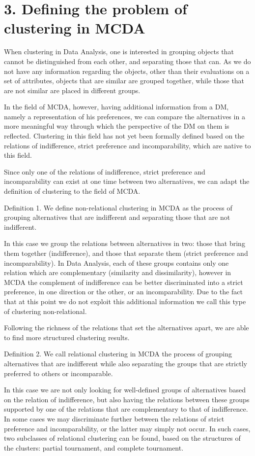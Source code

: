 \documentclass[10pt]{article}
\begin{document}
\section*{3. Defining the problem of clustering in MCDA}
When clustering in Data Analysis, one is interested in grouping objects that cannot be distinguished from each other, and separating those that can. As we do not have any information regarding the objects, other than their evaluations on a set of attributes, objects that are similar are grouped together, while those that are not similar are placed in different groups.

In the field of MCDA, however, having additional information from a DM, namely a representation of his preferences, we can compare the alternatives in a more meaningful way through which the perspective of the DM on them is reflected. Clustering in this field has not yet been formally defined based on the relations of indifference, strict preference and incomparability, which are native to this field.

Since only one of the relations of indifference, strict preference and incomparability can exist at one time between two alternatives, we can adapt the definition of clustering to the field of MCDA.

Definition 1. We define non-relational clustering in MCDA as the process of grouping alternatives that are indifferent and separating those that are not indifferent.

In this case we group the relations between alternatives in two: those that bring them together (indifference), and those that separate them (strict preference and incomparability). In Data Analysis, each of these groups contains only one relation which are complementary (similarity and dissimilarity), however in MCDA the complement of indifference can be better discriminated into a strict preference, in one direction or the other, or an incomparability. Due to the fact that at this point we do not exploit this additional information we call this type of clustering non-relational.

Following the richness of the relations that set the alternatives apart, we are able to find more structured clustering results.

Definition 2. We call relational clustering in MCDA the process of grouping alternatives that are indifferent while also separating the groups that are strictly preferred to others or incomparable.

In this case we are not only looking for well-defined groups of alternatives based on the relation of indifference, but also having the relations between these groups supported by one of the relations that are complementary to that of indifference.
In some cases we may discriminate further between the relations of strict preference and incomparability, or the latter may simply not occur. In such cases, two subclasses of relational clustering can be found, based on the structures of the clusters: partial tournament, and complete tournament.
\end{document}
